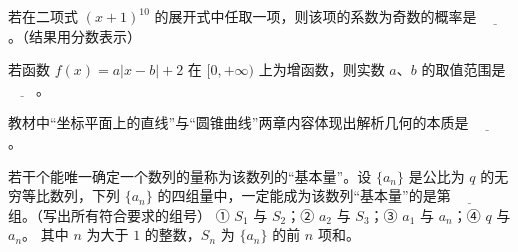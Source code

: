\begin{question}
若在二项式 $(x + 1)^{10}$ 的展开式中任取一项，则该项的系数为奇数的概率是 $\underline{\qquad}$。（结果用分数表示）

\end{question}
\begin{question}
若函数 $f(x) = a|x - b| + 2$ 在 $[0, +\infty)$ 上为增函数，则实数 $a$、$b$ 的取值范围是 $\underline{\qquad}$。

\end{question}
\begin{question}
教材中“坐标平面上的直线”与“圆锥曲线”两章内容体现出解析几何的本质是 $\underline{\qquad}$。

\end{question}
\begin{question}
若干个能唯一确定一个数列的量称为该数列的“基本量”。设 $\{a_n\}$ 是公比为 $q$ 的无穷等比数列，下列 $\{a_n\}$ 的四组量中，一定能成为该数列“基本量”的是第 $\underline{\qquad}$ 组。（写出所有符合要求的组号）
① $S_1$ 与 $S_2$；② $a_2$ 与 $S_3$；③ $a_1$ 与 $a_n$；④ $q$ 与 $a_n$。
其中 $n$ 为大于 $1$ 的整数，$S_n$ 为 $\{a_n\}$ 的前 $n$ 项和。

\end{question}


